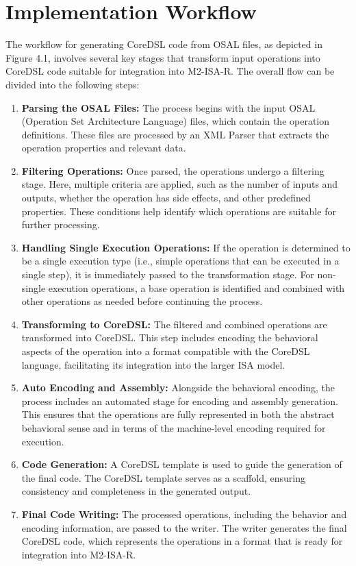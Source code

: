 \section{Implementation Workflow}

The workflow for generating CoreDSL code from OSAL files, as depicted in Figure 4.1, involves several key stages that transform input operations into CoreDSL code suitable for integration into M2-ISA-R. The overall flow can be divided into the following steps:

\begin{enumerate}
    \item \textbf{Parsing the OSAL Files:} The process begins with the input OSAL (Operation Set Architecture Language) files, which contain the operation definitions. These files are processed by an XML Parser that extracts the operation properties and relevant data.

    \item \textbf{Filtering Operations:} Once parsed, the operations undergo a filtering stage. Here, multiple criteria are applied, such as the number of inputs and outputs, whether the operation has side effects, and other predefined properties. These conditions help identify which operations are suitable for further processing.

    \item \textbf{Handling Single Execution Operations:} If the operation is determined to be a single execution type (i.e., simple operations that can be executed in a single step), it is immediately passed to the transformation stage. For non-single execution operations, a base operation is identified and combined with other operations as needed before continuing the process.

    \item \textbf{Transforming to CoreDSL:} The filtered and combined operations are transformed into CoreDSL. This step includes encoding the behavioral aspects of the operation into a format compatible with the CoreDSL language, facilitating its integration into the larger ISA model.

    \item \textbf{Auto Encoding and Assembly:} Alongside the behavioral encoding, the process includes an automated stage for encoding and assembly generation. This ensures that the operations are fully represented in both the abstract behavioral sense and in terms of the machine-level encoding required for execution.

    \item \textbf{Code Generation:} A CoreDSL template is used to guide the generation of the final code. The CoreDSL template serves as a scaffold, ensuring consistency and completeness in the generated output.

    \item \textbf{Final Code Writing:} The processed operations, including the behavior and encoding information, are passed to the writer. The writer generates the final CoreDSL code, which represents the operations in a format that is ready for integration into M2-ISA-R.

\end{enumerate}

